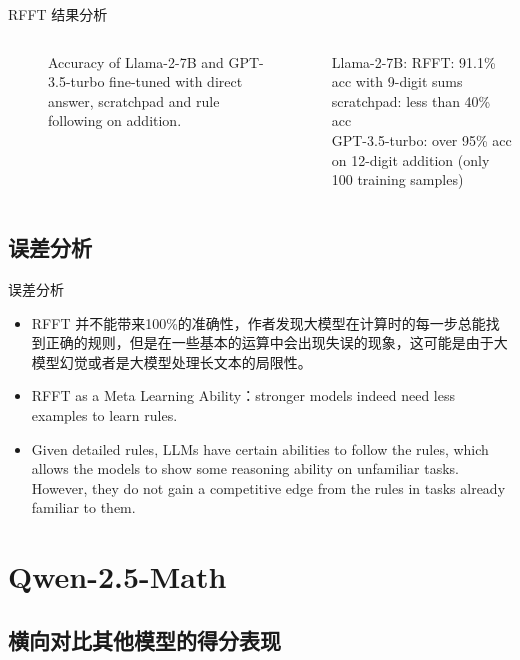 \documentclass[aspectratio=169]{beamer}
\begin{document}
\begin{frame}{RFFT 结果分析}
\begin{columns}
\begin{column}{.7\textwidth}
\begin{figure}[t]
				\caption{Accuracy of Llama-2-7B and GPT-3.5-turbo fine-tuned with direct answer, scratchpad and rule following on addition.}
				\label{fig:rfft}
				\vspace{-5pt}
			\end{figure}
		\end{column}
		\begin{column}{.3\textwidth} Llama-2-7B: RFFT: 91.1\% acc with 9-digit sums\\[0.2cm] scratchpad: less than 40\% acc\\[0.2cm] GPT-3.5-turbo: over 95\% acc on 12-digit addition (only 100 training samples) \end{column}
	\end{columns}
\end{frame}

\subsection{误差分析}
\begin{frame}{误差分析}
	\begin{itemize}
		\item RFFT 并不能带来100\%的准确性，作者发现大模型在计算时的每一步总能找到正确的规则，但是在一些基本的运算中会出现失误的现象，这可能是由于大模型幻觉或者是大模型处理长文本的局限性。\\[0.4cm]
		      \pause
		\item RFFT as a Meta Learning Ability：stronger models indeed need less examples to learn rules.\\[0.4cm]
		      \pause
		\item Given detailed rules, LLMs have certain abilities to follow the rules, which allows the models to show some reasoning ability on unfamiliar tasks. However, they do not gain a competitive edge from the rules in tasks already familiar to them.
	\end{itemize}
\end{frame}





\section{Qwen-2.5-Math}

\subsection{横向对比其他模型的得分表现}
\end{document}
